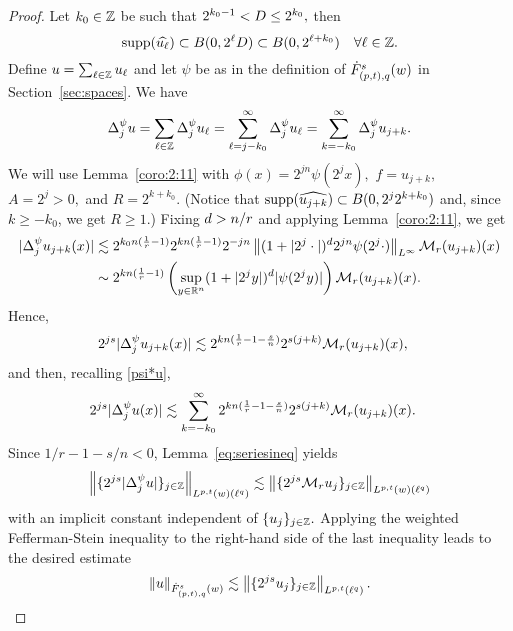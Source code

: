 {{{{{{\begin{proof}
Let $k_0 \in \ent$ be such that $2^{k_0 -1} < \A\leq 2^{k_0},$ then  
$$
\supp(\widehat{u_\ell}) \subset B(0, 2^\ell \A) \subset B(0, 2^{\ell +k_0}) \quad \forall \ell \in \ent.
$$
Define $u =\sum_{\ell \in \ent} u_\ell$ and let $\psi$ be as in the definition of $\tlw{(p,t)}{s}{q}{w}$ in Section~\ref{sec:spaces}. We have
\begin{equation}\label{psi*u}
\Delta^\psi_j u = \sum_{\ell \in \ent} \Delta^\psi_j u_\ell = \sum_{\ell = j - k_0}^\infty \Delta^\psi_j  u_\ell = \sum_{k = - k_0}^\infty \Delta^\psi_j u_{j+k}.
\end{equation}
We will use Lemma~\ref{coro:2:11} with $\phi(x) =  2^{jn} \psi(2^j x),$  $f = u_{j+k},$  $A= 2^{j  } >0,$ and $R= 2^{k + k_0}.$ (Notice that $\supp(\widehat{u_{j+k}}) \subset  B(0, 2^{j} 2^{k + k_0})$ and, since $k \geq -k_0$, we get $R \geq 1$.) Fixing  $\ex>n/r$ and applying Lemma~\ref{coro:2:11}, we get
\begin{align*}
|\Delta^\psi_j  u_{j+k}(x)| & \lesssim   2^{k_0n(\frac{1}{r} -1)} 2^{k n (\frac{1}{r} -1)}  2^{-jn} \norm{(1 + |2^j \cdot|)^\ex 2^{jn}\psi (2^j\cdot)}{L^\infty}  \M_r(u_{j+k})(x)\\
& \sim  2^{k n (\frac{1}{r} -1)} \left( \sup_{y \in \rn} (1 + |2^j y|)^\ex |\psi(2^j y)|\right) \M_r(u_{j+k})(x).
\end{align*}
 Hence,
\begin{align*}
2^{js}|\Delta^\psi_j  u_{j+k}(x)| & \lesssim 2^{k n (\frac{1}{r} -1-\frac{s}{n})} 2^{s(j+k)}\M_r(u_{j+k})(x),
\end{align*}
and then, recalling \eqref{psi*u}, 
\begin{align*}
2^{js} |\Delta^\psi_j  u(x)| & \lesssim  \sum_{k =  - k_0}^\infty 2^{k n (\frac{1}{r} -1-\frac{s}{n})} 2^{s(j+k)}\M_r(u_{j+k})(x).
\end{align*}
Since $1/r -1-s/n < 0$,   Lemma~\ref{eq:seriesineq}  yields
$$
\norm{\{ 2^{js} |\Delta^\psi_j  u|\}_{j\in\ent}}{L^{p,t}(w)(\ell^{q})} \lesssim \norm{\{2^{js} \M_ru_j\}_{j\in\ent}}{L^{p,t}(w)(\ell^{q})}
$$
with an implicit constant independent of $\{u_j\}_{j\in \ent}.$
Applying the weighted  Fefferman-Stein inequality  to the right-hand side of the last inequality leads to the desired estimate
\begin{equation*}
\norm{u}{\tlw{(p,t)}{s}{q}{w}} \lesssim \norm{\{2^{js}u_j\}_{j\in\ent}}{L^{p,t}(\ell^{q})}.
\end{equation*}



\end{proof}}}}}}}
